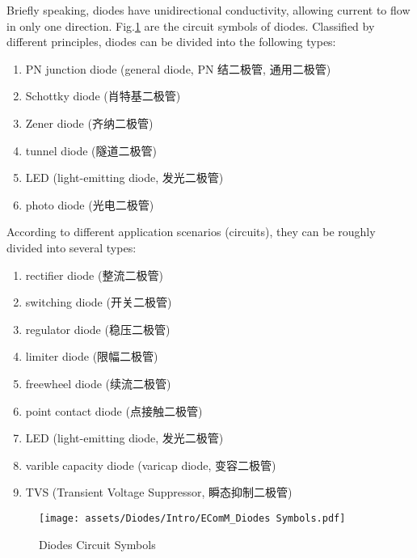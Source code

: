 \documentclass[UTF8]{report}
\begin{document}
Briefly speaking, diodes have unidirectional conductivity, allowing current to flow in only one direction. Fig.\ref{Diodes Circuit Symbols} are the circuit symbols of diodes.
Classified  by different principles, diodes can be divided into the following types:
\begin{enumerate}
    \item PN junction diode (general diode, PN 结二极管, 通用二极管)
    \item Schottky diode (肖特基二极管)
    \item Zener diode (齐纳二极管)
    \item tunnel diode (隧道二极管)
    \item LED (light-emitting diode, 发光二极管)
    \item photo diode (光电二极管)
    \end{enumerate}
    According to different application scenarios (circuits), they can be roughly divided into several types:
    \begin{enumerate}
    \item rectifier diode (整流二极管)
    \item switching diode (开关二极管)
    \item regulator diode (稳压二极管)
    \item limiter diode (限幅二极管)
    \item freewheel diode (续流二极管)
    \item point contact diode (点接触二极管)
    \item LED (light-emitting diode, 发光二极管)
    \item varible capacity diode (varicap diode, 变容二极管)
    \item TVS (Transient Voltage Suppressor, 瞬态抑制二极管)
\end{enumerate}
\begin{figure}[H]\centering
    \texttt{[image: assets/Diodes/Intro/EComM\_Diodes Symbols.pdf]}
    \caption{Diodes Circuit Symbols}
    \label{Diodes Circuit Symbols}
\end{figure}
\end{document}
